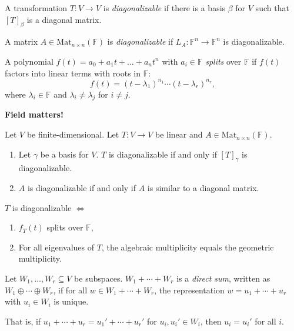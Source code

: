 \documentclass{article}
\begin{document}
\begin{definition}[Diagonalizable]
A transformation \( T: V \to V \) is \emph{diagonalizable} if there is a basis \( \beta \) for \( V \) such that \( [T]_{\beta} \) is a diagonal matrix.

A matrix \( A \in \mathrm{Mat}_{n \times n}(\mathbb{F}) \) is \emph{diagonalizable} if \( L_A: \mathbb{F}^n \to \mathbb{F}^n \) is diagonalizable.
\end{definition}

\begin{definition}[Splits]
A polynomial \( f(t) = a_0 + a_1 t + \ldots + a_n t^n \) with \( a_i \in \mathbb{F} \) \emph{splits} over \( \mathbb{F} \) if \( f(t) \) factors into linear terms with roots in \( \mathbb{F} \):
\[
f(t) = (t - \lambda_1)^{n_1} \cdots (t - \lambda_r)^{n_r},
\]
where \( \lambda_i \in \mathbb{F} \) and \( \lambda_i \neq \lambda_j \) for \( i \neq j \).

\textbf{Field matters!}
\end{definition}

\begin{lemma}
Let \( V \) be finite-dimensional. Let \( T: V \to V \) be linear and \( A \in \mathrm{Mat}_{n \times n}(\mathbb{F}) \).
\begin{enumerate}
    \item Let \(\gamma\) be a basis for \( V \). \( T \) is diagonalizable if and only if \( [T]_{\gamma} \) is diagonalizable.
    \item \( A \) is diagonalizable if and only if \( A \) is similar to a diagonal matrix.
\end{enumerate}
\end{lemma}



\begin{theorem} \(T\) is diagonalizable \(\Leftrightarrow\)
\begin{enumerate}
    \item \( f_T(t) \) splits over \( \mathbb{F} \),
    \item For all eigenvalues of \( T \), the algebraic multiplicity equals the geometric multiplicity.
\end{enumerate}
\end{theorem}

\begin{definition}
Let \( W_1, \ldots, W_r \subseteq V \) be subspaces. \( W_1 + \cdots + W_r \) is a \emph{direct sum}, written as \( W_1 \oplus \cdots \oplus W_r \), if for all \( w \in W_1 + \cdots + W_r \), the representation \( w = u_1 + \cdots + u_r \) with \( u_i \in W_i \) is unique.

That is, if \( u_1 + \cdots + u_r = u_1' + \cdots + u_r' \) for \( u_i, u_i' \in W_i \), then \( u_i = u_i' \) for all \( i \).
\end{definition}
\end{document}
